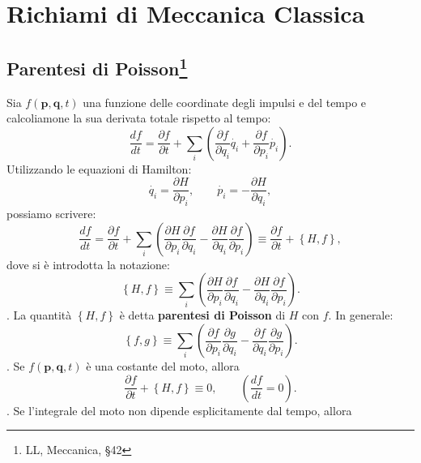 \chapter{Richiami di Meccanica Classica}
\section[Parentesi di Poisson]{Parentesi di Poisson\footnote{LL, Meccanica, \S 42}}
Sia $f(\mathbf{p},\mathbf{q},t)$ una funzione delle coordinate degli impulsi e del tempo e calcoliamone la sua derivata totale rispetto al tempo:
\begin{equation}
\frac{df}{dt}= \frac{\partial f}{\partial t} + \sum_i \left( \frac{\partial f}{\partial q_i} \dot {q_i} + \frac{\partial f}{\partial p_i} \dot {p_i} \right).
\end{equation}
Utilizzando le equazioni di Hamilton:
\begin{equation}
\dot{q_i}=\frac{\partial H}{\partial p_i} , \qquad \dot{p_i}=-\frac{\partial H}{\partial q_i} ,
\end{equation}
possiamo scrivere:
\begin{equation}
\frac{df}{dt}=	\frac{\partial f}{\partial t} + \sum_i \left( \frac{\partial H}{\partial p_i}\frac{\partial f}{\partial q_i}-\frac{\partial H}{\partial q_i}\frac{\partial f}{\partial p_i}\right) \equiv \frac{\partial f}{\partial t} + \left\lbrace H,f \right\rbrace ,
\end{equation}
dove si \`e introdotta la notazione:
\begin{equation}
\left\lbrace H,f \right\rbrace \equiv \sum_i \left(\frac{\partial H}{\partial p_i}\frac{\partial f}{\partial q_i}-\frac{\partial H}{\partial q_i}\frac{\partial f}{\partial p_i}\right)  .
\end{equation}.
La quantit\`a $\left\lbrace H,f \right\rbrace$ è detta \textbf{parentesi di Poisson} di $H$ con $f$. In generale:
\begin{equation}
\left\lbrace f,g \right\rbrace \equiv \sum_i \left(\frac{\partial f}{\partial p_i}\frac{\partial g}{\partial q_i}-\frac{\partial f}{\partial q_i}\frac{\partial g}{\partial p_i}\right)  .
\end{equation}.
Se $f(\mathbf{p},\mathbf{q},t)$ \`e una costante del moto, allora
\begin{equation}
\frac{\partial f}{\partial t}+\left\lbrace H,f \right\rbrace   \equiv 0 , \qquad
\left( \frac{df}{dt}=0 \right) .
\end{equation}.
Se l'integrale del moto non dipende esplicitamente dal tempo, allora
